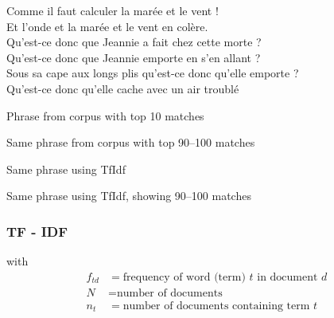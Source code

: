 \begin{frame}[t]
{   Comme il faut calculer la marée et le vent !\\
   Et l'onde et la marée et le vent en colère.\\[5mm]

   Qu'est-ce donc que Jeannie a fait chez cette morte ?\\
   Qu'est-ce donc que Jeannie emporte en s'en allant ?\\[5mm]

   Sous sa cape aux longs plis qu'est-ce donc qu'elle emporte ?\\
   Qu'est-ce donc qu'elle cache avec un air troublé
  }
\end{frame}

\begin{frame}
  Phrase from corpus with top 10 matches
\end{frame}

\begin{frame}
  Same phrase from corpus with top 90--100 matches
\end{frame}

\begin{frame}
  Same phrase using TfIdf
\end{frame}

\begin{frame}
  Same phrase using TfIdf, showing 90--100 matches
\end{frame}

\begin{frame}
  \frametitle{TF - IDF}

  with
  \begin{align*}
    f_{td} &= \mbox{frequency of word (term) $t$ in document $d$} \\
    N &= \mbox{number of documents}\\
    n_t &= \mbox{number of documents containing term $t$}
  \end{align*}
\end{frame}

\begin{frame}
\end{frame}

